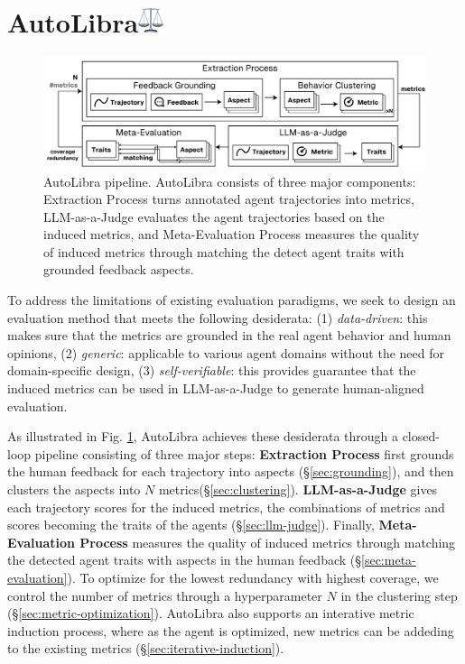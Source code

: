 \section{AutoLibra\protect\includegraphics[height=1em]{figs/scale.png}}

\begin{figure}[!t]
    \centering
    \includegraphics[width=\textwidth]{figs/autolibra-pipeline.pdf}
    \caption{AutoLibra pipeline. AutoLibra consists of three major components: Extraction Process
    turns annotated agent trajectories into metrics, LLM-as-a-Judge evaluates the agent trajectories
    based on the induced metrics, and Meta-Evaluation Process measures the quality of induced metrics
    through matching the detect agent traits with grounded feedback aspects.
    }
    \label{fig:autolibra-pipeline}
\end{figure}

To address the limitations of existing evaluation paradigms, we seek to design an evaluation method that 
meets the following desiderata: (1) \emph{data-driven}: this makes sure that the metrics are grounded
in the real agent behavior and human opinions, (2) \emph{generic}: applicable to various agent domains 
without the need for domain-specific design, (3) \emph{self-verifiable}: this provides guarantee that the 
induced metrics can be used in LLM-as-a-Judge to generate human-aligned evaluation. 

As illustrated in Fig. \ref{fig:autolibra-pipeline}, AutoLibra achieves these desiderata through a closed-loop pipeline
consisting of three major steps: \textbf{Extraction Process} first grounds the human feedback
for each trajectory into aspects (\S\ref{sec:grounding}), and then clusters the aspects into $N$ metrics(\S\ref{sec:clustering}).
\textbf{LLM-as-a-Judge} gives each trajectory scores for the induced metrics, the combinations of
metrics and scores becoming the traits of the agents (\S\ref{sec:llm-judge}).
Finally, \textbf{Meta-Evaluation Process} measures the quality of induced metrics through matching
the detected agent traits with aspects in the human feedback (\S\ref{sec:meta-evaluation}).
To optimize for the lowest redundancy with highest coverage, we control the number of metrics 
through a hyperparameter $N$ in the clustering step (\S\ref{sec:metric-optimization}). AutoLibra also supports
an interative metric induction process, where as the agent is optimized, new metrics can be addeding 
to the existing metrics (\S\ref{sec:iterative-induction}).

